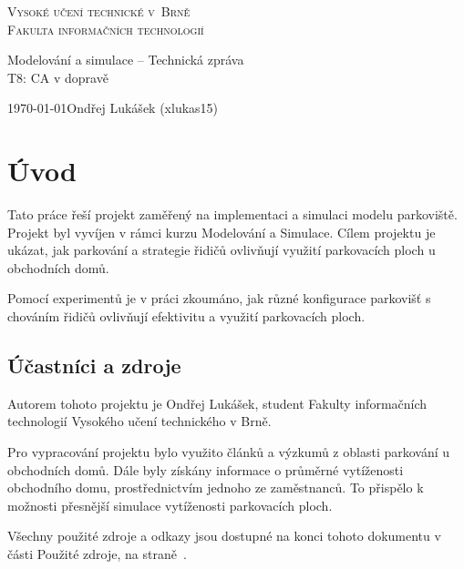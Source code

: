 \documentclass[11pt, a4paper]{article}
\begin{document}
\begin{titlepage}
    \begin{center}
        \Huge \textsc{Vysoké učení technické v~Brně}\\
        \huge \textsc{Fakulta informačních technologií}\\
        
        
        {\LARGE Modelování a simulace -- Technická zpráva\\
        \Huge T8: CA v dopravě}
        
    \end{center}
    
    {\Large \today \hfill Ondřej Lukášek (xlukas15)}
\end{titlepage}

\tableofcontents
\newpage

\section{Úvod}

Tato práce řeší projekt zaměřený na implementaci a simulaci modelu parkoviště. Projekt byl vyvíjen v rámci kurzu Modelování a Simulace. Cílem projektu je ukázat, jak parkování a strategie řidičů ovlivňují využití parkovacích ploch u obchodních domů. 

Pomocí experimentů je v práci zkoumáno, jak různé konfigurace parkovišť s chováním řidičů ovlivňují efektivitu a využití parkovacích ploch.

\subsection{Účastníci a zdroje}
\label{ucastnici}

Autorem tohoto projektu je Ondřej Lukášek, student Fakulty informačních technologií Vysokého učení technického v Brně.

Pro vypracování projektu bylo využito článků a výzkumů z oblasti parkování u obchodních domů. Dále byly získány informace o průměrné vytíženosti obchodního domu, prostřednictvím jednoho ze zaměstnanců. To přispělo k možnosti přesnější simulace vytíženosti parkovacích ploch.

Všechny použité zdroje a odkazy jsou dostupné na konci tohoto dokumentu v části Použité zdroje, na straně~\pageref{zdroje}.
\end{document}
